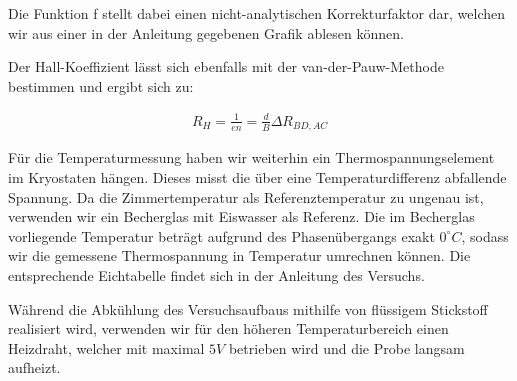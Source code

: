Die Funktion f stellt dabei einen nicht-analytischen Korrekturfaktor dar, welchen wir aus einer in der Anleitung gegebenen Grafik ablesen können. 

Der Hall-Koeffizient lässt sich ebenfalls mit der van-der-Pauw-Methode bestimmen und ergibt sich zu:

\begin{align}
R_H=\frac{1}{en}=\frac{d}{B}\Delta R_{BD,AC}
\end{align}

Für die Temperaturmessung haben wir weiterhin ein Thermospannungselement im Kryostaten hängen. Dieses misst die über eine Temperaturdifferenz abfallende Spannung. Da die Zimmertemperatur als Referenztemperatur zu ungenau ist, verwenden wir ein Becherglas mit Eiswasser als Referenz. Die im Becherglas vorliegende Temperatur beträgt aufgrund des Phasenübergangs exakt $0^{\circ}C$, sodass wir die gemessene Thermospannung in Temperatur umrechnen können. Die entsprechende Eichtabelle findet sich in der Anleitung des Versuchs.

Während die Abkühlung des Versuchsaufbaus mithilfe von flüssigem Stickstoff realisiert wird, verwenden wir für den höheren Temperaturbereich einen Heizdraht, welcher mit maximal $5V$ betrieben wird und die Probe langsam aufheizt. 